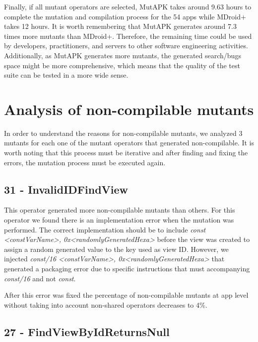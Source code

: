 Finally, if all mutant operators are selected, MutAPK takes around 9.63 hours to complete the mutation and compilation process for the 54 apps while MDroid+ takes 12 hours.  It is worth remembering that MutAPK generates around 7.3 times more mutants than MDroid+. Therefore, the remaining time could be used by developers,  practitioners, and servers to other software engineering activities. Additionally, as MutAPK generates more mutants, the generated search/bugs space  might be more comprehensive, which means that the quality of the test suite can be tested in a more wide sense.

\section{Analysis of non-compilable mutants}

In order to understand the reasons for non-compilable mutants, we analyzed 3 mutants for each one of the mutant operators that generated non-compilable. It is worth noting that this process must be iterative and after finding and fixing the errors, the mutation process must be executed again.

\subsection{31 - InvalidIDFindView}

This operator generated more non-compilable mutants than others. For this operator we found there is an implementation error when the mutation was performed. The correct implementation should be to include \textit{const <constVarName>, 0x<randomlyGeneratedHexa>} before the view was created to assign a random generated value to the key used as view ID. However, we injected \textit{const/16 <constVarName>, 0x<randomlyGeneratedHexa>} that generated a packaging error due to specific instructions that must accompanying \textit{const/16} and not \textit{const}.

After this error was fixed the percentage of non-compilable mutants at app level without taking into account non-shared operators decreases to 4\%.

\subsection{27 - FindViewByIdReturnsNull}

